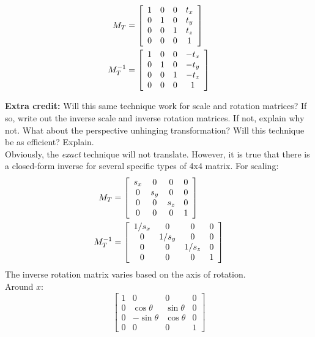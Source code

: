 \documentclass[10pt,twocolumn]{article}
\begin{document}
\begin{framed}
\begin{align*}
M_T &= \left[
\begin{array} {c c c c}
  1 & 0 & 0 & t_x \\
  0 & 1 & 0 & t_y \\
  0 & 0 & 1 & t_z \\ 
  0 & 0 & 0 & 1
\end{array} \right] \\
M_T^{-1} &= \left[
\begin{array} {c c c c}
  1 & 0 & 0 & -t_x \\
  0 & 1 & 0 & -t_y \\
  0 & 0 & 1 & -t_z \\ 
  0 & 0 & 0 & 1
\end{array} \right]
\end{align*}
\end{framed}

{\bf Extra credit:} Will this same technique work for scale and rotation
matrices? If so, write out the inverse scale and inverse rotation matrices. If
not, explain why not. What about the perspective unhinging transformation?
Will this technique be as efficient? Explain. \\
Obviously, the {\it exact} technique will not translate. However, it is true
that there is a closed-form inverse for several specific types of 4x4 matrix. 
For scaling:
\begin{align*}
M_T &= \left[
\begin{array} {c c c c}
  s_x & 0 & 0 & 0 \\
  0 & s_y & 0 & 0\\
  0 & 0 & s_z & 0 \\ 
  0 & 0 & 0 & 1
\end{array} \right] \\
M_T^{-1} &= \left[
\begin{array} {c c c c}
  1 / s_x & 0 & 0 & 0 \\
  0 & 1 / s_y & 0 & 0\\
  0 & 0 & 1 / s_z & 0 \\ 
  0 & 0 & 0 & 1
\end{array} \right]
\end{align*}
The inverse rotation matrix varies based on the axis of rotation.\\
Around $x$:
\[ \begin{bmatrix}
1 & 0 & 0 & 0 \\
0 & \cos{\theta} & \sin{\theta} & 0 \\
0 & -\sin{\theta} & \cos{\theta} & 0 \\
0 & 0 & 0 & 1 
\end{bmatrix} \]
\end{document}
